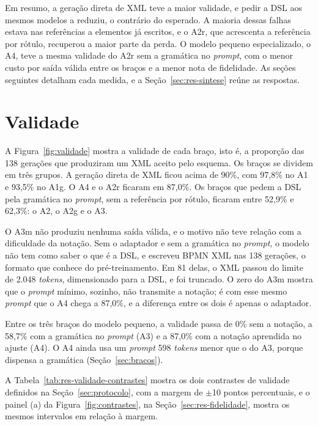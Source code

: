 Em resumo, a geração direta de XML teve a maior validade, e pedir a DSL aos mesmos modelos a reduziu, o contrário do esperado. A maioria dessas falhas estava nas referências a elementos já escritos, e o A2r, que acrescenta a referência por rótulo, recuperou a maior parte da perda. O modelo pequeno especializado, o A4, teve a mesma validade do A2r sem a gramática no \textit{prompt}, com o menor custo por saída válida entre os braços e a menor nota de fidelidade. As seções seguintes detalham cada medida, e a Seção~\ref{sec:res-sintese} reúne as respostas.

\section{Validade}\label{sec:res-validade}

A Figura~\ref{fig:validade} mostra a validade de cada braço, isto é, a proporção das 138 gerações que produziram um XML aceito pelo esquema. Os braços se dividem em três grupos. A geração direta de XML ficou acima de 90\%, com 97,8\% no A1 e 93,5\% no A1g. O A4 e o A2r ficaram em 87,0\%. Os braços que pedem a DSL pela gramática no \textit{prompt}, sem a referência por rótulo, ficaram entre 52,9\% e 62,3\%: o A2, o A2g e o A3.



O A3m não produziu nenhuma saída válida, e o motivo não teve relação com a dificuldade da notação. Sem o adaptador e sem a gramática no \textit{prompt}, o modelo não tem como saber o que é a DSL, e escreveu BPMN XML nas 138 gerações, o formato que conhece do pré-treinamento. Em 81 delas, o XML passou do limite de 2.048 \textit{tokens}, dimensionado para a DSL, e foi truncado. O zero do A3m mostra que o \textit{prompt} mínimo, sozinho, não transmite a notação; é com esse mesmo \textit{prompt} que o A4 chega a 87,0\%, e a diferença entre os dois é apenas o adaptador.

Entre os três braços do modelo pequeno, a validade passa de 0\% sem a notação, a 58,7\% com a gramática no \textit{prompt} (A3) e a 87,0\% com a notação aprendida no ajuste (A4). O A4 ainda usa um \textit{prompt} 598 \textit{tokens} menor que o do A3, porque dispensa a gramática (Seção~\ref{sec:bracos}).

A Tabela~\ref{tab:res-validade-contrastes} mostra os dois contrastes de validade definidos na Seção~\ref{sec:protocolo}, com a margem de $\pm$10 pontos percentuais, e o painel (a) da Figura~\ref{fig:contrastes}, na Seção~\ref{sec:res-fidelidade}, mostra os mesmos intervalos em relação à margem.

